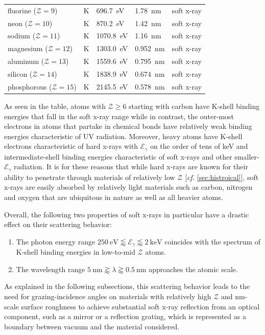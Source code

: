 \begin{table}[]
\begin{tabular}{@{}lllll@{}}
 fluorine ($\mathcal{Z}=9$) & K & \SI{696.7}{\electronvolt} & \SI{1.78}{\nano\metre} & soft x-ray \\
 neon ($\mathcal{Z}=10$) & K & \SI{870.2}{\electronvolt} & \SI{1.42}{\nano\metre} & soft x-ray \\
 sodium ($\mathcal{Z}=11$) & K & \SI{1070.8}{\electronvolt} & \SI{1.16}{\nano\metre} & soft x-ray \\
 magnesium ($\mathcal{Z}=12$) & K & \SI{1303.0}{\electronvolt} & \SI{0.952}{\nano\metre} & soft x-ray \\
 aluminum ($\mathcal{Z}=13$) & K & \SI{1559.6}{\electronvolt} & \SI{0.795}{\nano\metre} & soft x-ray \\
 silicon ($\mathcal{Z}=14$) & K & \SI{1838.9}{\electronvolt} & \SI{0.674}{\nano\metre} & soft x-ray \\
 phosphorous ($\mathcal{Z}=15$) & K & \SI{2145.5}{\electronvolt} & \SI{0.578}{\nano\metre} & soft x-ray \\
 \bottomrule
 \end{tabular}
 \end{table}
As seen in the table, atoms with $\mathcal{Z} \geq 6$ starting with carbon have K-shell binding energies that fall in the soft x-ray range while in contrast, the outer-most electrons in atoms that partake in chemical bonds have relatively weak binding energies characteristic of UV radiation. 
Moreover, heavy atoms have K-shell electrons characteristic of hard x-rays with $\mathcal{E}_{\gamma}$ on the order of tens of \si{\kilo\electronvolt} and intermediate-shell binding energies characteristic of soft x-rays and other smaller-$\mathcal{E}_{\gamma}$ radiation. 
It is for these reasons that while hard x-rays are known for their ability to penetrate through materials of relatively low $\mathcal{Z}$ [\emph{cf.\@} \cref{sec:histroical}], soft x-rays are easily absorbed by relatively light materials such as carbon, nitrogen and oxygen that are ubiquitous in nature as well as all heavier atoms. 

Overall, the following two properties of soft x-rays in particular have a drastic effect on their scattering behavior: 
\begin{enumerate}[noitemsep]
 \item The photon energy range $\SI{250}{\electronvolt} \lessapprox \mathcal{E}_{\gamma} \lessapprox \SI{2}{\kilo\electronvolt}$ coincides with the spectrum of K-shell binding energies in low-to-mid $\mathcal{Z}$ atoms.
 \item The wavelength range $\SI{5}{\nm} \gtrapprox \lambda \gtrapprox \SI{0.5}{\nm}$ approaches the atomic scale. 
\end{enumerate}
As explained in the following subsections, this scattering behavior leads to the need for grazing-incidence angles on materials with relatively high $\mathcal{Z}$ and \si{\nm}-scale surface roughness to achieve substantial soft x-ray reflection from an optical component, such as a mirror or a reflection grating, which is represented as a boundary between vacuum and the material considered. 


